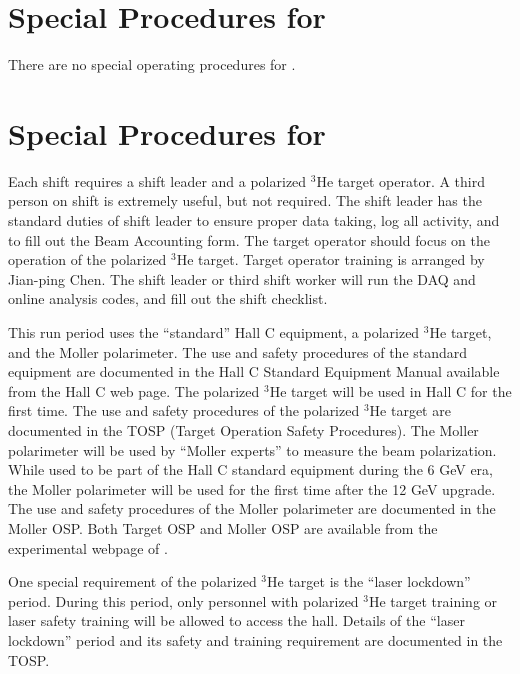 %
\newpage
\section{Special Procedures for \HALL}

There are no special operating procedures for \HALL{}.

%
\newpage
\section{Special Procedures for \EXPTS}\label{app:exp_req}

Each shift requires a shift leader and a polarized $^3$He target operator.
A third person on shift is extremely useful, but not required. The shift leader 
has the standard
duties of shift leader to ensure proper data taking, log all activity, and to fill out
the Beam Accounting form. The target operator should focus on the 
operation of the polarized $^3$He target. Target operator training is arranged by
Jian-ping Chen. The shift leader or third
shift worker will run the DAQ and online analysis codes, and fill out the shift checklist. 

This run period uses the ``standard'' Hall C equipment, 
a polarized $^3$He target, and the Moller polarimeter.
The use and safety procedures of the standard equipment are documented
in the Hall C Standard Equipment
Manual available from the Hall C web page.
The polarized $^3$He target will be used in Hall C for the first time.
The use and safety procedures of the polarized $^3$He target are 
documented in the TOSP (Target Operation Safety Procedures). 
The Moller polarimeter will be used by ``Moller experts'' to measure the beam
polarization. While used to be part of the Hall C standard equipment during the
6 GeV era, the Moller polarimeter will be used for the first time after the 12 GeV upgrade.
The use and safety procedures of the Moller polarimeter are
documented in the Moller OSP.
Both Target OSP and Moller OSP are available from the experimental webpage of \EXPTS. 

One special requirement of the polarized $^3$He target is the ``laser lockdown''
period. During this period, only personnel with polarized $^3$He target training or
laser safety training will be allowed
to access the hall. Details of the ``laser lockdown'' period and its safety and training
requirement are documented in the TOSP.

